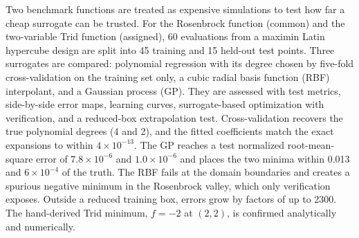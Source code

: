 Two benchmark functions are treated as expensive simulations to test how far a cheap surrogate can be trusted. For the Rosenbrock function (common) and the two-variable Trid function (assigned), 60 evaluations from a maximin Latin hypercube design are split into 45 training and 15 held-out test points. Three surrogates are compared: polynomial regression with its degree chosen by five-fold cross-validation on the training set only, a cubic radial basis function (RBF) interpolant, and a Gaussian process (GP). They are assessed with test metrics, side-by-side error maps, learning curves, surrogate-based optimization with verification, and a reduced-box extrapolation test. Cross-validation recovers the true polynomial degrees (4 and 2), and the fitted coefficients match the exact expansions to within $4\times10^{-13}$. The GP reaches a test normalized root-mean-square error of $7.8\times10^{-6}$ and $1.0\times10^{-6}$ and places the two minima within 0.013 and $6\times10^{-4}$ of the truth. The RBF fails at the domain boundaries and creates a spurious negative minimum in the Rosenbrock valley, which only verification exposes. Outside a reduced training box, errors grow by factors of up to 2300. The hand-derived Trid minimum, $f=-2$ at $(2,2)$, is confirmed analytically and numerically.
